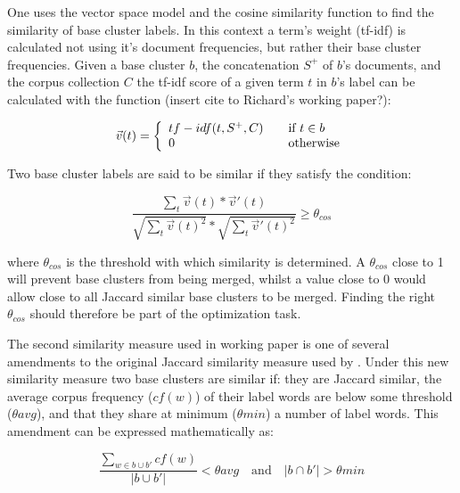 One uses the vector space model and the cosine similarity function to find the similarity of base cluster labels. In this context a term's weight (tf-idf) is calculated not using it's document frequencies, but rather their base cluster frequencies. Given a base cluster \(b\), the concatenation \(S^+\) of \(b\)'s documents, and the corpus collection \(C\) the tf-idf score of a given term \(t\) in \(b\)'s label can be calculated with the function (insert cite to Richard's working paper?):

\begin{displaymath}
\vec{v}(t) = \left\{
  \begin{array}{l l}
    tf-idf(t, S^+, C) & \quad \text{if $t \in b$}\\
    0 & \quad \text{otherwise}
  \end{array} \right.
\end{displaymath}

Two base cluster labels are said to be similar if they satisfy the condition:

\begin{displaymath}
\frac{\sum_{t}\vec{v}(t) * \vec{v}'(t)}
{\sqrt{\sum_{t}\vec{v}(t)^2} * \sqrt{\sum_{t}\vec{v}'(t)^2}}
\ge \theta_{cos}
\end{displaymath}

where \(\theta_{cos}\) is the threshold with which similarity is determined. A \(\theta_{cos}\) close to 1 will prevent base clusters from being merged, whilst a value close to 0 would allow close to all Jaccard similar base clusters to be merged. Finding the right \(\theta_{cos}\) should therefore be part of the optimization task.

The second similarity measure used in \supervisor working paper is one of several amendments to the original Jaccard similarity measure used by \citeauthor{Oren1998}. Under this new similarity measure two base clusters are similar if: they are Jaccard similar, the average corpus frequency (\(cf(w)\)) of their label words are below some threshold (\(\theta avg\)), and that they share at minimum (\(\theta min\)) a number of label words. This amendment can be expressed mathematically as:

\begin{displaymath}
\frac{\sum\limits_{w \in b \cup b'} cf(w)}{\vert b \cup b' \vert} < \theta avg \quad \text{and} \quad \vert b \cap b' \vert > \theta min
\end{displaymath}

%


